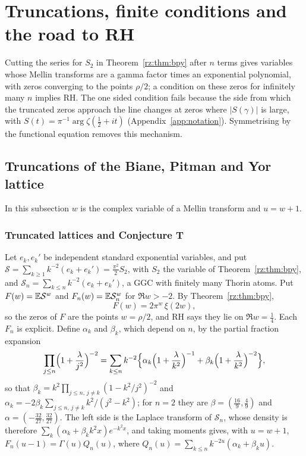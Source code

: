 \section{Truncations, finite conditions and the road to RH}\label{ch:rz4}

Cutting the series for $S_2$ in Theorem~\ref{rz:thm:bpy} after $n$ terms gives variables whose Mellin transforms are a gamma factor times an exponential polynomial, with zeros converging to the points $\rho/2$; a condition on these zeros for infinitely many $n$ implies RH. The one sided condition fails because the side from which the truncated zeros approach the line changes at zeros where $|S(\gamma)|$ is large, with $S(t)=\pi^{-1}\arg\zeta(\frac12+it)$ (Appendix~\ref{app:notation}). Symmetrising by the functional equation removes this mechanism.

\subsection{Truncations of the Biane, Pitman and Yor lattice}\label{rz:sec:finite}

In this subsection $w$ is the complex variable of a Mellin transform and $u=w+1$.

\subsubsection{Truncated lattices and Conjecture T}

Let $e_k,e_k'$ be independent standard exponential variables, and put $\mathcal S=\sum_{k\ge1}k^{-2}(e_k+e_k')=\frac{\pi^2}2S_2$, with $S_2$ the variable of Theorem~\ref{rz:thm:bpy}, and $\mathcal S_n=\sum_{k\le n}k^{-2}(e_k+e_k')$, a GGC with finitely many Thorin atoms. Put $F(w)=\mathbb{E}\mathcal S^w$ and $F_n(w)=\mathbb{E}\mathcal S_n^w$ for $\Re w>-2$. By Theorem~\ref{rz:thm:bpy},
\[
F(w)=2\pi^{w}\,\xi(2w),
\]
so the zeros of $F$ are the points $w=\rho/2$, and RH says they lie on $\Re w=\frac14$. Each $F_n$ is explicit. Define $\alpha_k$ and $\beta_k$, which depend on $n$, by the partial fraction expansion
\[
\prod_{j\le n}\Bigl(1+\frac\lambda{j^2}\Bigr)^{-2}=\sum_{k\le n}k^{-2}\Bigl\{\alpha_k\Bigl(1+\frac\lambda{k^2}\Bigr)^{-1}+\beta_k\Bigl(1+\frac\lambda{k^2}\Bigr)^{-2}\Bigr\},
\]
so that $\beta_k=k^2\prod_{j\le n,\,j\ne k}(1-k^2/j^2)^{-2}$ and $\alpha_k=-2\beta_k\sum_{j\le n,\,j\ne k}k^2/(j^2-k^2)$; for $n=2$ they are $\beta=(\frac{16}9,\frac49)$ and $\alpha=(-\frac{32}{27},\frac{32}{27})$. The left side is the Laplace transform of $\mathcal S_n$, whose density is therefore $\sum_k(\alpha_k+\beta_kk^2x)e^{-k^2x}$, and taking moments gives, with $u=w+1$, $F_n(u-1)=\Gamma(u)Q_n(u)$, where $Q_n(u)=\sum_{k\le n}k^{-2u}(\alpha_k+\beta_ku)$.

